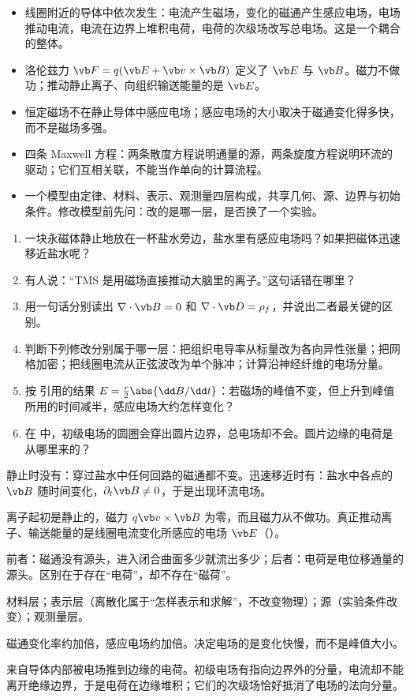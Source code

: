 \begin{takeaways}
\begin{itemize}
\item 线圈附近的导体中依次发生：电流产生磁场，变化的磁通产生感应电场，电场推动电流，电流在边界上堆积电荷，电荷的次级场改写总电场。这是一个耦合的整体。
\item 洛伦兹力 $\vb F=q(\vb E+\vb v\times\vb B)$ 定义了 $\vb E$ 与 $\vb B$。磁力不做功；推动静止离子、向组织输送能量的是 $\vb E$。
\item 恒定磁场不在静止导体中感应电场；感应电场的大小取决于磁通变化得多快，而不是磁场多强。
\item 四条 Maxwell 方程：两条散度方程说明通量的源，两条旋度方程说明环流的驱动；它们互相关联，不能当作单向的计算流程。
\item 一个模型由定律、材料、表示、观测量四层构成，共享几何、源、边界与初始条件。修改模型前先问：改的是哪一层，是否换了一个实验。
\end{itemize}
\end{takeaways}

\begin{selfcheck}
\begin{enumerate}
\item 一块永磁体静止地放在一杯盐水旁边，盐水里有感应电场吗？如果把磁体迅速移近盐水呢？
\item 有人说：“TMS 是用磁场直接推动大脑里的离子。”这句话错在哪里？
\item 用一句话分别读出 $\nabla\cdot\vb B=0$ 和 $\nabla\cdot\vb D=\rho_f$，并说出二者最关键的区别。
\item 判断下列修改分别属于哪一层：把组织电导率从标量改为各向异性张量；把网格加密；把线圈电流从正弦波改为单个脉冲；计算沿神经纤维的电场分量。
\item 按 引用的结果 $E=\tfrac r2\abs{\dd B/\dd t}$：若磁场的峰值不变，但上升到峰值所用的时间减半，感应电场大约怎样变化？
\item 在 中，初级电场的圆圈会穿出圆片边界，总电场却不会。圆片边缘的电荷是从哪里来的？
\end{enumerate}
\end{selfcheck}

\begin{answers}
\item 静止时没有：穿过盐水中任何回路的磁通都不变。迅速移近时有：盐水中各点的 $\vb B$ 随时间变化，$\partial_t\vb B\neq0$，于是出现环流电场。
\item 离子起初是静止的，磁力 $q\vb v\times\vb B$ 为零，而且磁力从不做功。真正推动离子、输送能量的是线圈电流变化所感应的电场 $\vb E$（）。
\item 前者：磁通没有源头，进入闭合曲面多少就流出多少；后者：电荷是电位移通量的源头。区别在于存在“电荷”，却不存在“磁荷”。
\item 材料层；表示层（离散化属于“怎样表示和求解”，不改变物理）；源（实验条件改变）；观测量层。
\item 磁通变化率约加倍，感应电场约加倍。决定电场的是变化快慢，而不是峰值大小。
\item 来自导体内部被电场推到边缘的电荷。初级电场有指向边界外的分量，电流却不能离开绝缘边界，于是电荷在边缘堆积；它们的次级场恰好抵消了电场的法向分量。
\end{answers}
